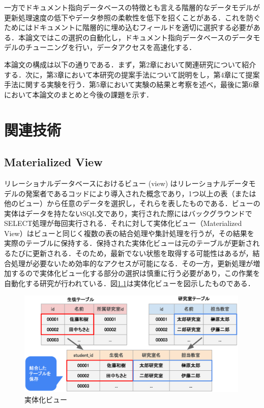 \documentclass[a4paper,11pt]{ujreport}
\begin{document}
一方でドキュメント指向データベースの特徴とも言える階層的なデータモデルが更新処理速度の低下やデータ参照の柔軟性を低下を招くことがある．これを防ぐためにはドキュメントに階層的に埋め込むフィールドを適切に選択する必要がある．本論文ではこの選択の自動化し，ドキュメント指向データベースのデータモデルのチューニングを行い，データアクセスを高速化する．

本論文の構成は以下の通りである．まず，第2章において関連研究について紹介する．次に，第3章において本研究の提案手法について説明をし，第4章にて提案手法に関する実験を行う．第5章において実験の結果と考察を述べ，最後に第6章において本論文のまとめと今後の課題を示す．

\chapter{関連技術}
\section{Materialized View}
リレーショナルデータベースにおけるビュー (view) はリレーショナルデータモデルの発案者であるコッドにより導入された概念であり\cite{Codd1974RecentII}，1つ以上の表（または他のビュー）から任意のデータを選択し，それらを表したものである．ビューの実体はデータを持たないSQL文であり，実行された際にはバックグラウンドでSELECT処理が毎回実行される．それに対して実体化ビュー（Materialized View）はビューと同じく複数の表の結合処理や集計処理を行うが，その結果を実際のテーブルに保持する．保持された実体化ビューは元のテーブルが更新されるたびに更新される．そのため，最新でない状態を取得する可能性はあるが，結合処理が必要ないため効率的なアクセスが可能になる．その一方，更新処理が増加するので実体化ビュー化する部分の選択は慎重に行う必要があり，この作業を自動化する研究が行われている\cite{mistry2001materialized}．図\ref{figure:MvDescription}は実体化ビューを図示したものである．
\begin{figure}[htbp]
	\begin{center}
		\includegraphics[width=30em, trim=0 5em 0 0]{src/MvDescription.eps} %
	\end{center}
	\caption{実体化ビュー}
	\label{figure:MvDescription}
\end{figure}
\end{document}
